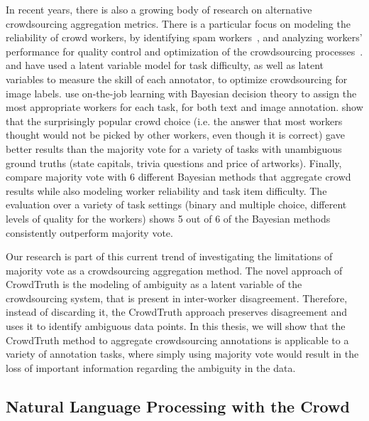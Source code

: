 In recent years, there is also a growing body of research on alternative crowdsourcing aggregation metrics. There is a particular focus on modeling the reliability of crowd workers, by identifying spam workers~\cite{Bozzon:2013,Kittur2008,Ipeirotis:2010}, and analyzing workers' performance for quality control and optimization of the crowdsourcing processes~\cite{Singer:2013}. \citet{NIPS2009_3644} and \citet{welinder2010multidimensional} have used a latent variable model for task difficulty, as well as latent variables to measure the skill of each annotator, to optimize crowdsourcing for image labels. \citet{werling2015job} use on-the-job learning with Bayesian decision theory to assign the most appropriate workers for each task, for both text and image annotation. \citet{prelec2017solution} show that the surprisingly popular crowd choice (i.e. the answer that most workers thought would not be picked by other workers, even though it is correct) gave better results than the majority vote for a variety of tasks with unambiguous ground truths (state capitals, trivia questions and price of artworks). Finally, \citet{paun2018comparing} compare majority vote with 6 different Bayesian methods that aggregate crowd results while also modeling worker reliability and task item difficulty. The evaluation over a variety of task settings (binary and multiple choice, different levels of quality for the workers) shows 5 out of 6 of the Bayesian methods consistently outperform majority vote.

Our research is part of this current trend of investigating the limitations of majority vote as a crowdsourcing aggregation method. The novel approach of CrowdTruth is the modeling of ambiguity as a latent variable of the crowdsourcing system, that is present in inter-worker disagreement. Therefore, instead of discarding it, the CrowdTruth approach preserves disagreement and uses it to identify ambiguous data points. In this thesis, we will show that the CrowdTruth method to aggregate crowdsourcing annotations is applicable to a variety of annotation tasks, where simply using majority vote would result in the loss of important information regarding the ambiguity in the data.


\subsection{Natural Language Processing with the Crowd}

